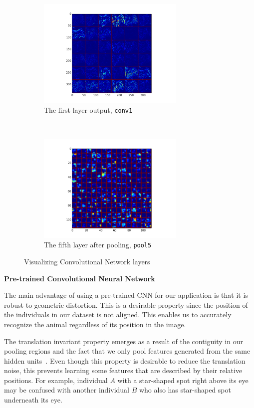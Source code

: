\begin{figure}[htbp]
\begin{subfigure}[t]{0.45\textwidth}
      \centering
      \includegraphics[width=7cm]{preprocess/lastconv1}
      \caption{The first layer output, \texttt{conv1}}
  \end{subfigure}
  ~
  \begin{subfigure}[t]{0.45\textwidth}
      \centering
      \includegraphics[width=7cm]{preprocess/lastpool5}
      \caption{The fifth layer after pooling, \texttt{pool5}}
  \end{subfigure}
  \captionsetup{justification=centering}
  \caption{Visualizing Convolutional Network layers}
\end{figure}


\textbf{Pre-trained Convolutional Neural Network}

The main advantage of using a pre-trained CNN for our application is that it is
robust to geometric distortion. This is a desirable property since the position
of the individuals in our dataset is not aligned. This enables us to
accurately recognize the animal regardless of its position in the image. 

The translation invariant property emerges as a result of the contiguity in our
pooling regions and the fact that we only pool features generated from the same
hidden units~\cite{ufldl}. Even though this property is desirable to reduce the
translation noise, this prevents learning some features that are described by
their relative positions. For example, individual $A$ with a star-shaped spot
right above its eye may be confused with another individual $B$ who also has
star-shaped spot underneath its eye. 

